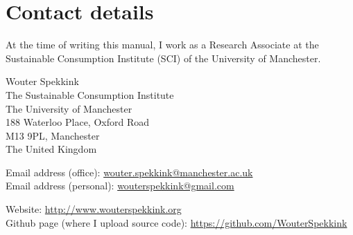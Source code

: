 \documentclass{memoir}
\begin{document}
\chapter{Contact details}
\label{chap:contactdetails}

At the time of writing this manual, I work as a Research Associate at the Sustainable Consumption Institute (SCI) of the University of Manchester.

Wouter Spekkink \\
The Sustainable Consumption Institute \\
The University of Manchester \\
188 Waterloo Place, Oxford Road \\
M13 9PL, Manchester \\
The United Kingdom

Email address (office): \href{mailto:wouter.spekkink@manchester.ac.uk}{wouter.spekkink@manchester.ac.uk} \\
Email address (personal): \href{mailto:wouterspekkink@gmail.com}{wouterspekkink@gmail.com}

Website: \url{http://www.wouterspekkink.org} \\
Github page (where I upload source code): \url{https://github.com/WouterSpekkink}
\end{document}
